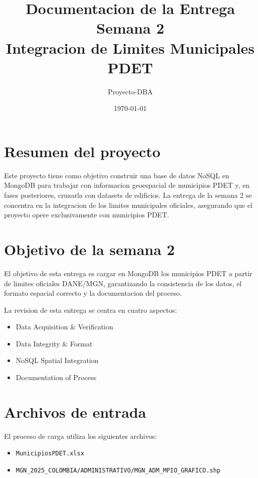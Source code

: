 \documentclass[12pt]{article}
\title{Documentacion de la Entrega Semana 2\\Integracion de Limites Municipales PDET}
\author{Proyecto-DBA}
\date{\today}
\begin{document}
\maketitle

\section{Resumen del proyecto}

Este proyecto tiene como objetivo construir una base de datos NoSQL en MongoDB para trabajar con informacion geoespacial de municipios PDET y, en fases posteriores, cruzarla con datasets de edificios. La entrega de la semana 2 se concentra en la integracion de los limites municipales oficiales, asegurando que el proyecto opere exclusivamente con municipios PDET.

\section{Objetivo de la semana 2}

El objetivo de esta entrega es cargar en MongoDB los municipios PDET a partir de limites oficiales DANE/MGN, garantizando la consistencia de los datos, el formato espacial correcto y la documentacion del proceso.

La revision de esta entrega se centra en cuatro aspectos:

\begin{itemize}[leftmargin=*]
    \item Data Acquisition \& Verification
    \item Data Integrity \& Format
    \item NoSQL Spatial Integration
    \item Documentation of Process
\end{itemize}

\section{Archivos de entrada}

El proceso de carga utiliza los siguientes archivos:

\begin{itemize}[leftmargin=*]
    \item \texttt{MunicipiosPDET.xlsx}
    \item \texttt{MGN\_2025\_COLOMBIA/ADMINISTRATIVO/MGN\_ADM\_MPIO\_GRAFICO.shp}
\end{itemize}
\end{document}
